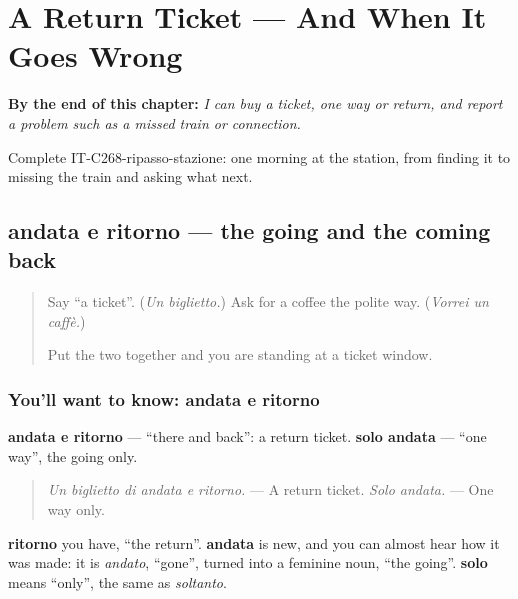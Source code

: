 
\chapter{A Return Ticket --- And When It Goes Wrong}
\label{ch:it-a-return-ticket}

\begin{chapteropening}
\textbf{By the end of this chapter:} \emph{I can buy a ticket, one way or return, and report a problem such as a missed train or connection.}

Complete IT-C268-ripasso-stazione: one morning at the station, from finding it to missing the train and asking what next.
\end{chapteropening}

\section[andata e ritorno]{andata e ritorno — the going and the coming back}

\label{lesson:IT-C268-andata-e-ritorno}



\begin{quote}
Say \textquotedblleft{}a ticket\textquotedblright{}. (\emph{Un biglietto.}) Ask for a coffee the polite way. (\emph{Vorrei un caffè.})

Put the two together and you are standing at a ticket window.
\end{quote}

\subsection*{You'll want to know: andata e ritorno}
\textbf{andata e ritorno} — \textquotedblleft{}there and back\textquotedblright{}: a return ticket. \textbf{solo andata} — \textquotedblleft{}one way\textquotedblright{}, the going only.

\begin{quote}
\emph{Un biglietto di andata e ritorno.} — A return ticket. \emph{Solo andata.} — One way only.
\end{quote}

\textbf{ritorno} you have, \textquotedblleft{}the return\textquotedblright{}. \textbf{andata} is new, and you can almost hear how it was made: it is \emph{andato}, \textquotedblleft{}gone\textquotedblright{}, turned into a feminine noun, \textquotedblleft{}the going\textquotedblright{}. \textbf{solo} means \textquotedblleft{}only\textquotedblright{}, the same as \emph{soltanto}.


